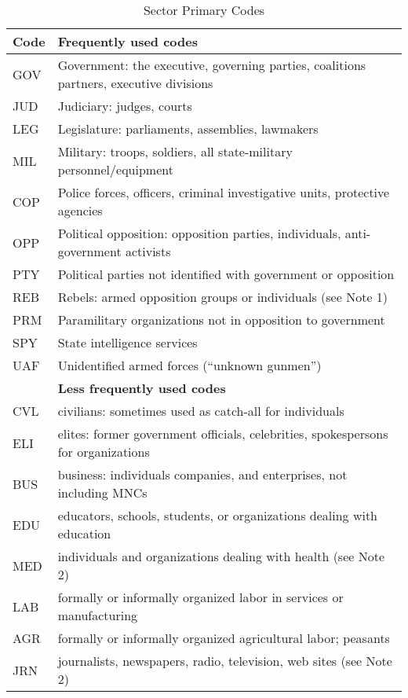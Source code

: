 \documentclass[11pt]{report}
\begin{document}
\begin{center}
\begin{longtable}{|l|p{13cm}|}
\caption{Sector Primary Codes}
\label{tab:roles}
 \\ \cline{1-2}
  \textbf{Code} & \textbf{Frequently used codes}\\
  \hline
	  GOV & Government: the executive, governing parties, coalitions partners, executive divisions \\ 
	  JUD & Judiciary: judges, courts \\ 
	  LEG & Legislature: parliaments, assemblies, lawmakers \\
	  MIL & Military: troops, soldiers, all state-military personnel/equipment\\ 
	  COP & Police forces, officers, criminal investigative units, protective agencies \\ 
	  OPP & Political opposition: opposition parties, individuals, anti-government activists \\
	  PTY & Political parties not identified with government or opposition \\
	  REB & Rebels: armed opposition groups or individuals (see Note 1)\\ 
	  PRM & Paramilitary organizations not in opposition to government\\ 
	  SPY & State intelligence services \\ 
	  UAF & Unidentified armed forces (``unknown gunmen'') \\ 
  \hline
~   & \textbf{Less frequently used codes}\\
 \hline
	  CVL & civilians: sometimes used as catch-all for individuals \\
	  ELI & elites: former government officials, celebrities, spokespersons for organizations \\
	  BUS & business: individuals companies, and enterprises, not including MNCs \\  
	  EDU & educators, schools, students, or organizations dealing with education \\ 
	  MED & individuals and organizations dealing with health (see Note 2) \\
	  LAB & formally or informally organized labor in services or manufacturing \\
	  AGR & formally or informally organized agricultural labor; peasants \\
	  JRN & journalists, newspapers, radio, television, web sites (see Note 2)  \\ 

\end{longtable}
\end{center}
\end{document}
